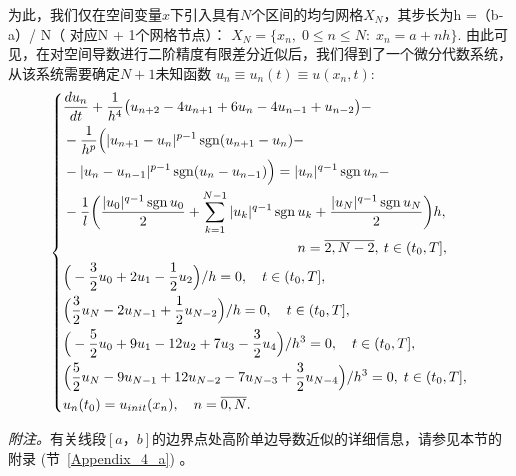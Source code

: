 \documentclass[twoside]{book}
\DeclareMathOperator{\sign}{sgn}
\begin{document}
\begin{CJK*}{GBK}{song}
为此，我们仅在空间变量$x$下引入具有$N$个区间的均匀网格$X_N$，其步长为h =（b-a）/ N（ 对应N + 1个网格节点）： $X_N = \{x_n, \; 0 \leqslant n \leqslant N: \; x_n = a + n h\}$. 由此可见，在对空间导数进行二阶精度有限差分近似后，我们得到了一个微分代数系统，从该系统需要确定$ N + 1 $未知函数 $u_{n} \equiv  u_{n}(t) \equiv u(x_n,t)$:
\begin{equation*}
\left\{
\begin{aligned}
&\dfrac{d u_{n}}{d t} + \dfrac{1}{h^4}\big(u_{n + 2} - 4 u_{n + 1} + 6 u_{n} - 4 u_{n - 1} + u_{n - 2}\big) - \\
&- \dfrac{1}{h^p}\Big(|u_{n + 1} - u_n|^{p - 1}\sign(u_{n + 1} - u_n) - \\
& - |u_{n} - u_{n - 1}|^{p - 1}\sign(u_{n} - u_{n - 1})\Big) = |u_n|^{q - 1} \sign u_n - \\
&- \dfrac{1}{l} \bigg(\dfrac{|u_0|^{q - 1} \sign u_0}{2} + \sum\limits_{k = 1}^{N - 1} |u_k|^{q - 1} \sign u_k  + \dfrac{|u_N|^{q - 1} \sign u_N}{2}\bigg)h, \\
&\hspace{+5.9cm} n = \overline{2,N - 2}, \: t \in (t_0,T], \\
&\Big(-\dfrac{3}{2} u_0 + 2 u_1 - \dfrac{1}{2} u_2\Big)/h = 0, \quad t \in (t_0,T],\\
&\Big(\dfrac{3}{2} u_N - 2 u_{N - 1} + \dfrac{1}{2} u_{N - 2}\Big)/h = 0, \quad t \in (t_0,T],\\
&\Big(-\dfrac{5}{2} u_0 + 9 u_1 - 12 u_2 + 7 u_3 - \dfrac{3}{2} u_4\Big)/h^3 = 0, \quad t \in (t_0,T],\\
&\Big(\dfrac{5}{2} u_N - 9 u_{N - 1} + 12 u_{N - 2} - 7 u_{N - 3} + \dfrac{3}{2} u_{N - 4}\Big)/h^3 = 0, \; t \in (t_0,T],\\
&u_n(t_0) = u_{init}(x_n), \quad n = \overline{0,N}.
\end{aligned}
\right.
\end{equation*}

\emph{附注。}有关线段$ [a，b] $的边界点处高阶单边导数近似的详细信息，请参见本节的附录 (节~\ref{Appendix_4_a}) 。


\end{CJK*}
\end{document}
